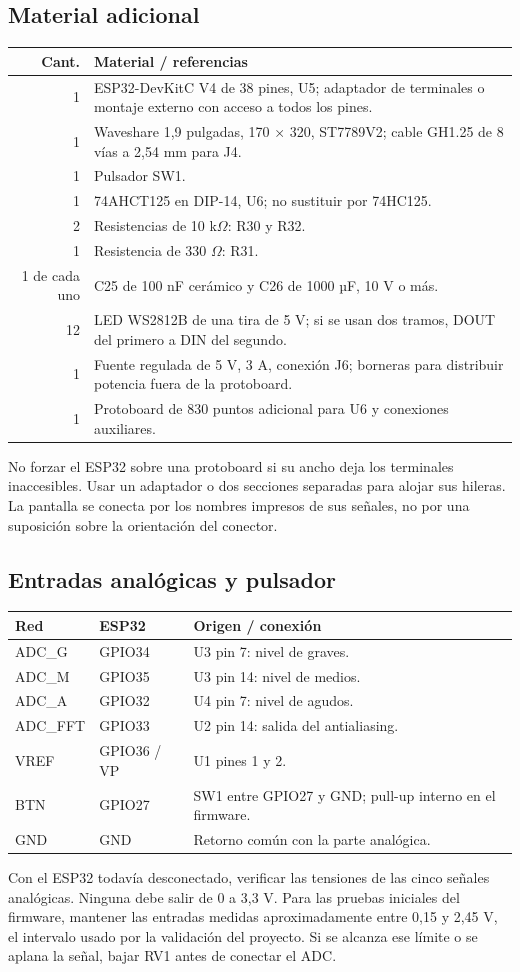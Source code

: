 \documentclass[10pt,a4paper]{article}
\begin{document}
\subsection{Material adicional}
\begin{tabularx}{\linewidth}{r X}\toprule
Cant. & Material / referencias\\\midrule
1 & ESP32-DevKitC V4 de 38 pines, U5; adaptador de terminales o montaje externo con acceso a todos los pines.\\
1 & Waveshare 1,9 pulgadas, 170 × 320, ST7789V2; cable GH1.25 de 8 vías a 2,54 mm para J4.\\
1 & Pulsador SW1.\\
1 & 74AHCT125 en DIP-14, U6; no sustituir por 74HC125.\\
2 & Resistencias de 10 k\ensuremath{\Omega}: R30 y R32.\\
1 & Resistencia de 330 \ensuremath{\Omega}: R31.\\
1 de cada uno & C25 de 100 nF cerámico y C26 de 1000 µF, 10 V o más.\\
12 & LED WS2812B de una tira de 5 V; si se usan dos tramos, DOUT del primero a DIN del segundo.\\
1 & Fuente regulada de 5 V, 3 A, conexión J6; borneras para distribuir potencia fuera de la protoboard.\\
1 & Protoboard de 830 puntos adicional para U6 y conexiones auxiliares.\\\bottomrule
\end{tabularx}
No forzar el ESP32 sobre una protoboard si su ancho deja los terminales inaccesibles. Usar un adaptador o dos secciones separadas para alojar sus hileras. La pantalla se conecta por los nombres impresos de sus señales, no por una suposición sobre la orientación del conector.

\subsection{Entradas analógicas y pulsador}
\begin{tabularx}{\linewidth}{l l X}\toprule
Red & ESP32 & Origen / conexión\\\midrule
ADC\_G & GPIO34 & U3 pin 7: nivel de graves.\\
ADC\_M & GPIO35 & U3 pin 14: nivel de medios.\\
ADC\_A & GPIO32 & U4 pin 7: nivel de agudos.\\
ADC\_FFT & GPIO33 & U2 pin 14: salida del antialiasing.\\
VREF & GPIO36 / VP & U1 pines 1 y 2.\\
BTN & GPIO27 & SW1 entre GPIO27 y GND; pull-up interno en el firmware.\\
GND & GND & Retorno común con la parte analógica.\\\bottomrule
\end{tabularx}
Con el ESP32 todavía desconectado, verificar las tensiones de las cinco señales analógicas. Ninguna debe salir de 0 a 3,3 V. Para las pruebas iniciales del firmware, mantener las entradas medidas aproximadamente entre 0,15 y 2,45 V, el intervalo usado por la validación del proyecto. Si se alcanza ese límite o se aplana la señal, bajar RV1 antes de conectar el ADC.
\end{document}
